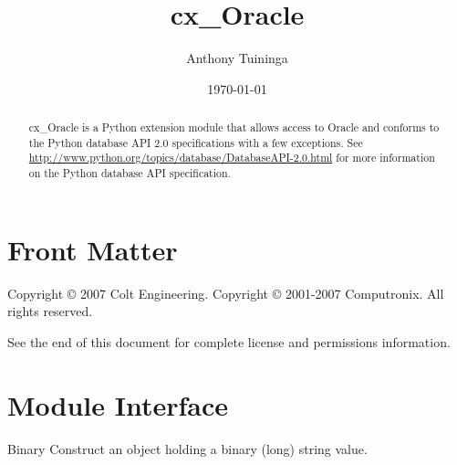 \documentclass{manual}
\title{cx\_Oracle}
\author{Anthony Tuininga}
\date{\today}                   %
\begin{document}
\maketitle

\ifhtml
\chapter*{Front Matter\label{front}}
\fi

Copyright \copyright{} 2007 Colt Engineering.
Copyright \copyright{} 2001-2007 Computronix.
All rights reserved.

See the end of this document for complete license and permissions
information.

\begin{abstract}

\noindent
cx_Oracle is a Python extension module that allows access to Oracle and
conforms to the Python database API 2.0 specifications with a few exceptions.
See \url{http://www.python.org/topics/database/DatabaseAPI-2.0.html} for more
information on the Python database API specification.

\end{abstract}

\tableofcontents

\chapter{Module Interface\label{module}}

\begin{funcdesc}{Binary}{}
  Construct an object holding a binary (long) string value.
\end{funcdesc}
\end{document}
